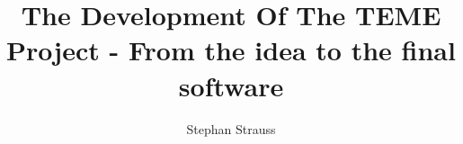 \documentclass{scrartcl}
\author{Stephan Strauss}
\begin{document}
    \title{The Development Of The TEME Project - From the idea to the final software}
    \maketitle
\end{document}
